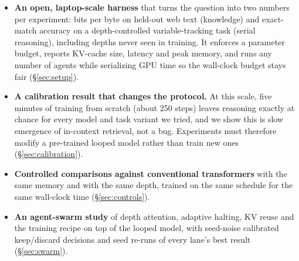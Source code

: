 \begin{itemize}
\item \textbf{An open, laptop-scale harness} that turns the question into two numbers per experiment:
  bits per byte on held-out web text (knowledge) and exact-match accuracy on a depth-controlled
  variable-tracking task (serial reasoning), including depths never seen in training. It enforces a
  parameter budget, reports KV-cache size, latency and peak memory, and runs any number of agents
  while serializing GPU time so the wall-clock budget stays fair (\S\ref{sec:setup}).
\item \textbf{A calibration result that changes the protocol.} At this scale, five minutes of training
  from scratch (about 250 steps) leaves reasoning exactly at chance for every model and task variant
  we tried, and we show this is slow emergence of in-context retrieval, not a bug. Experiments must
  therefore modify a pre-trained looped model rather than train new ones (\S\ref{sec:calibration}).
\item \textbf{Controlled comparisons against conventional transformers} with the same memory and with
  the same depth, trained on the same schedule for the same wall-clock time (\S\ref{sec:controls}).
\item \textbf{An agent-swarm study} of depth attention, adaptive halting, KV reuse and the training
  recipe on top of the looped model, with seed-noise calibrated keep/discard decisions and seed
  re-runs of every lane's best result (\S\ref{sec:swarm}).
\end{itemize}
